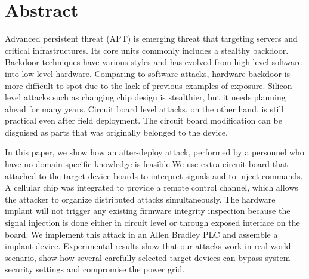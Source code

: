 \section{Abstract}
\label{sec:abstract}
Advanced persistent threat (APT) is emerging threat that targeting servers and critical infrastructures.
Its core units commonly includes a stealthy backdoor. Backdoor techniques have various styles and has evolved from high-level software into low-level hardware. Comparing to software attacks, hardware backdoor is more difficult to spot due to the lack of previous examples of exposure. Silicon level attacks such as changing chip design is stealthier, but it needs planning ahead for many years. Circuit board level attacks, on the other hand, is still practical even after field deployment. The circuit board modification can be disguised as parts that was originally belonged to the device. 

In this paper, we show how an after-deploy attack, performed by a personnel who have no domain-specific knowledge is feasible.We use extra circuit board that attached to the target device boards to interpret signals and to inject commands. A cellular chip was integrated to provide a remote control channel, which allows the attacker to organize distributed attacks simultaneously. The hardware implant will not trigger any existing firmware integrity inspection because the signal injection is done either in circuit level or through exposed interface on the board. We implement this attack in an Allen Bradley PLC and assemble a implant device. Experimental results show that our attacks work in real world scenario, show how several carefully selected target devices can bypass system security settings and compromise the power grid.
